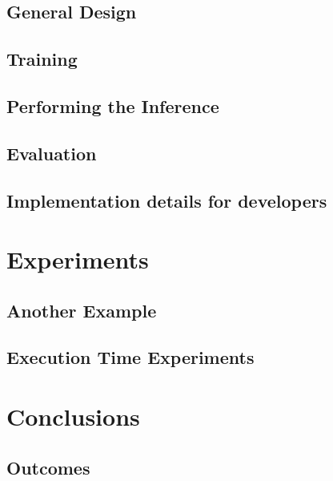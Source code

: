 \documentclass[11pt,twoside]{article}
\numberwithin{Theorem}{section}
\numberwithin{Definition}{section}
\numberwithin{Lemma}{section}
\numberwithin{Algorithm}{section}
\numberwithin{equation}{section}
\begin{document}
\subsection{General Design}
\label{subsec:general_design}
% 


\subsection{Training}
\label{subsec:training}


\subsection{Performing the Inference}
\label{subsec:inference}


\subsection{Evaluation}
\label{subsec:evaluation}


\subsection{Implementation details for developers}
\label{subsec:developers}



\clearpage
\section{Experiments}

\subsection{Another Example}

\subsection{Execution Time Experiments}

\section{Conclusions}

\subsection{Outcomes}
\end{document}
